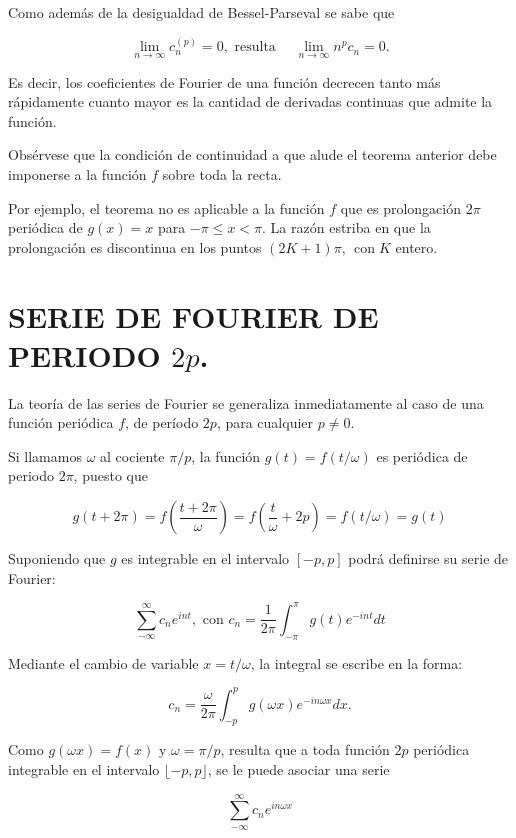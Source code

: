 \documentclass[10pt]{article}
\theoremstyle{plain}
\theoremstyle{definition}
\theoremstyle{remark}
\begin{document}
Como además de la desigualdad de Bessel-Parseval se sabe que


\begin{equation*}
\lim _{n \rightarrow \infty} c_{n}^{(p)}=0, \text { resulta } \quad \lim _{n \rightarrow \infty} n^{p} c_{n}=0 . \tag{5-24}
\end{equation*}


Es decir, los coeficientes de Fourier de una función decrecen tanto más rápidamente cuanto mayor es la cantidad de derivadas continuas que admite la función.

Obsérvese que la condición de continuidad a que alude el teorema anterior debe imponerse a la función $f$ sobre toda la recta.

Por ejemplo, el teorema no es aplicable a la función $f$ que es prolongación $2 \pi$ periódica de $g(x)=x$ para $-\pi \leqslant x<\pi$. La razón estriba en que la prolongación es discontinua en los puntos $(2 K+1) \pi$, $\operatorname{con} K$ entero.

\section*{SERIE DE FOURIER DE PERIODO $2 p$.}
La teoría de las series de Fourier se generaliza inmediatamente al caso de una función periódica $f$, de período $2 p$, para cualquier $p \neq 0$.

Si llamamos $\omega$ al cociente $\pi / p$, la función $g(t)=f(t / \omega)$ es periódica de periodo $2 \pi$, puesto que

$$
g(t+2 \pi)=f\left(\frac{t+2 \pi}{\omega}\right)=f\left(\frac{t}{\omega}+2 p\right)=f(t / \omega)=g(t)
$$

Suponiendo que $g$ es integrable en el intervalo $[-p, p]$ podrá definirse su serie de Fourier:

$$
\sum_{-\infty}^{\infty} c_{n} e^{i n t}, \text { con } c_{n}=\frac{1}{2 \pi} \int_{-\pi}^{\pi} g(t) e^{-i n t} d t
$$

Mediante el cambio de variable $x=t / \omega$, la integral se escribe en la forma:

$$
c_{n}=\frac{\omega}{2 \pi} \int_{-p}^{p} g(\omega x) e^{-i n \omega x} d x .
$$

Como $g(\omega x)=f(x)$ y $\omega=\pi / p$, resulta que a toda función $2 p$ periódica integrable en el intervalo $\lfloor-p, p\rfloor$, se le puede asociar una serie


\begin{equation*}
\sum_{-\infty}^{\infty} c_{n} e^{i n \omega x} \tag{5.25}
\end{equation*}
\end{document}
